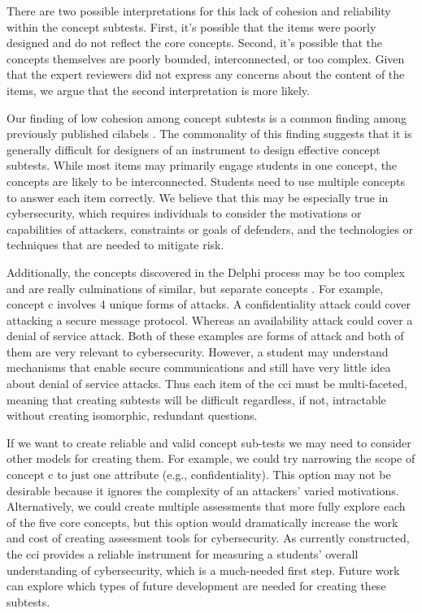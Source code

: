 There are two possible interpretations for this lack of cohesion and reliability within the concept subtests. First, it's possible that the items were poorly designed and do not reflect the core concepts. Second, it's possible that the concepts themselves are poorly bounded, interconnected, or too complex. Given that the expert reviewers did not express any concerns about the content of the items, we argue that the second interpretation is more likely. 

Our finding of low cohesion among concept subtests is a common finding among previously published \glspl{cilabel} \cite{jorian}. The commonality of this finding suggests that it is generally difficult for designers of an instrument to design effective concept subtests. While most items may primarily engage students in one concept, the concepts are likely to be interconnected. Students need to use multiple concepts to answer each item correctly. We believe that this may be especially true in cybersecurity, which requires individuals to consider the motivations or capabilities of attackers, constraints or goals of defenders, and the technologies or techniques that are needed to mitigate risk.

Additionally, the concepts discovered in the Delphi process may be too complex and are really culminations of similar, but separate concepts \cite{delphi}. For example, concept \gls{c} involves 4 unique forms of attacks. A confidentiality attack could cover attacking a secure message protocol. Whereas an availability attack could cover a denial of service attack. Both of these examples are forms of attack and both of them are very relevant to cybersecurity. However, a student may understand mechanisms that enable secure communications and still have very little idea about denial of service attacks. Thus each item of the \gls{cci} must be multi-faceted, meaning that creating subtests will be difficult regardless, if not, intractable without creating isomorphic, redundant questions.


If we want to create reliable and valid concept sub-tests we may need to consider other models for creating them. For example, we could try narrowing the scope of concept \gls{c} to just one attribute (e.g., confidentiality). This option may not be desirable because it ignores the complexity of an attackers' varied motivations. Alternatively, we could create multiple assessments that more fully explore each of the five core concepts, but this option would dramatically increase the work and cost of creating assessment tools for cybersecurity. As currently constructed, the \gls{cci} provides a reliable instrument for measuring a students' overall understanding of cybersecurity, which is a much-needed first step. Future work can explore which types of future development are needed for creating these subtests.

